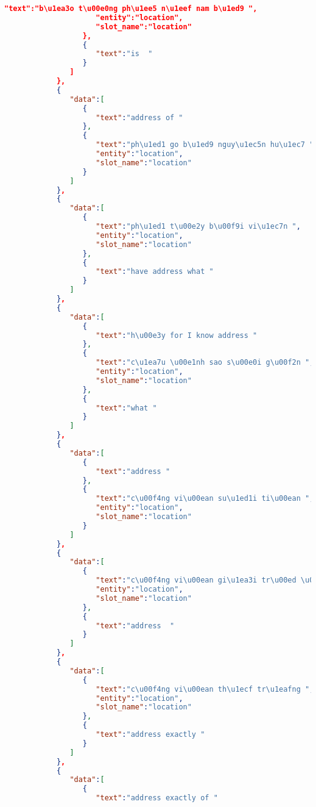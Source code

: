 \begin{lstlisting}[language=json,firstnumber=1]
                     "text":"b\u1ea3o t\u00e0ng ph\u1ee5 n\u1eef nam b\u1ed9 ",
                     "entity":"location",
                     "slot_name":"location"
                  },
                  {
                     "text":"is  "
                  }
               ]
            },
            {
               "data":[
                  {
                     "text":"address of "
                  },
                  {
                     "text":"ph\u1ed1 go b\u1ed9 nguy\u1ec5n hu\u1ec7 ",
                     "entity":"location",
                     "slot_name":"location"
                  }
               ]
            },
            {
               "data":[
                  {
                     "text":"ph\u1ed1 t\u00e2y b\u00f9i vi\u1ec7n ",
                     "entity":"location",
                     "slot_name":"location"
                  },
                  {
                     "text":"have address what "
                  }
               ]
            },
            {
               "data":[
                  {
                     "text":"h\u00e3y for I know address "
                  },
                  {
                     "text":"c\u1ea7u \u00e1nh sao s\u00e0i g\u00f2n ",
                     "entity":"location",
                     "slot_name":"location"
                  },
                  {
                     "text":"what "
                  }
               ]
            },
            {
               "data":[
                  {
                     "text":"address "
                  },
                  {
                     "text":"c\u00f4ng vi\u00ean su\u1ed1i ti\u00ean ",
                     "entity":"location",
                     "slot_name":"location"
                  }
               ]
            },
            {
               "data":[
                  {
                     "text":"c\u00f4ng vi\u00ean gi\u1ea3i tr\u00ed \u0111\u1ea7m sen ",
                     "entity":"location",
                     "slot_name":"location"
                  },
                  {
                     "text":"address  "
                  }
               ]
            },
            {
               "data":[
                  {
                     "text":"c\u00f4ng vi\u00ean th\u1ecf tr\u1eafng ",
                     "entity":"location",
                     "slot_name":"location"
                  },
                  {
                     "text":"address exactly "
                  }
               ]
            },
            {
               "data":[
                  {
                     "text":"address exactly of "

\end{lstlisting}
